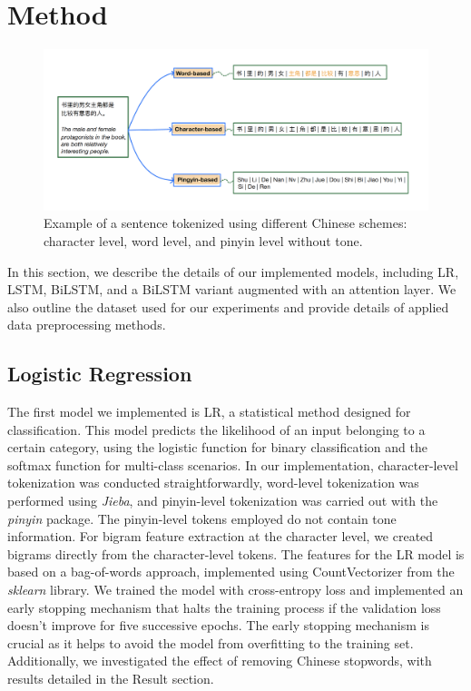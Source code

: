 \section{Method}

\begin{figure}[t]
    \centering
    \includegraphics[width=14cm]{tokenization.png}
    \caption{Example of a sentence tokenized using different Chinese schemes: character level, word level, and pinyin level without tone.}
    \label{fig:figure1}
\end{figure}

In this section, we describe the details of our implemented models, including LR, LSTM, BiLSTM, and a BiLSTM variant augmented with an attention layer. We also outline the dataset used for our experiments and provide details of applied data preprocessing methods.

\subsection{Logistic Regression}
The first model we implemented is LR, a statistical method designed for classification. This model predicts the likelihood of an input belonging to a certain category, using the logistic function for binary classification and the softmax function for multi-class scenarios. In our implementation, character-level tokenization was conducted straightforwardly, word-level tokenization was performed using \textit{Jieba}, and pinyin-level tokenization was carried out with the \textit{pinyin} package. The pinyin-level tokens employed do not contain tone information. For bigram feature extraction at the character level, we created bigrams directly from the character-level tokens. The features for the LR model is based on a bag-of-words approach, implemented using CountVectorizer from the \textit{sklearn} library. We trained the model with cross-entropy loss and implemented an early stopping mechanism that halts the training process if the validation loss doesn't improve for five successive epochs. The early stopping mechanism is crucial as it helps to avoid the model from overfitting to the training set. Additionally, we investigated the effect of removing Chinese stopwords, with results detailed in the Result section. 

